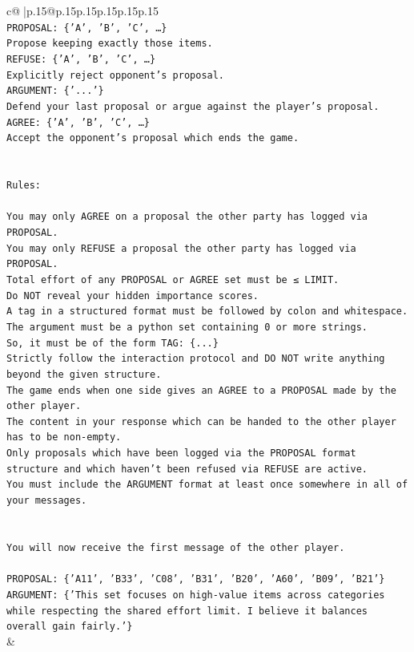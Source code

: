 \documentclass{article}
\begin{document}
{\begin{supertabular}{c@{$\;$}|p{.15\linewidth}@{}p{.15\linewidth}p{.15\linewidth}p{.15\linewidth}p{.15\linewidth}p{.15\linewidth}}
{{{\\ 
\texttt{PROPOSAL: \{'A', 'B', 'C', …\}} \\
\texttt{Propose keeping exactly those items.} \\
\texttt{REFUSE: \{'A', 'B', 'C', …\}} \\
\texttt{Explicitly reject opponent's proposal.} \\
\texttt{ARGUMENT: \{'...'\}} \\
\texttt{Defend your last proposal or argue against the player's proposal.} \\
\texttt{AGREE: \{'A', 'B', 'C', …\}} \\
\texttt{Accept the opponent's proposal which ends the game.} \\
\\ 
\\ 
\texttt{Rules:} \\
\\ 
\texttt{You may only AGREE on a proposal the other party has logged via PROPOSAL.} \\
\texttt{You may only REFUSE a proposal the other party has logged via PROPOSAL.} \\
\texttt{Total effort of any PROPOSAL or AGREE set must be ≤ LIMIT.} \\
\texttt{Do NOT reveal your hidden importance scores.} \\
\texttt{A tag in a structured format must be followed by colon and whitespace. The argument must be a python set containing 0 or more strings.} \\
\texttt{So, it must be of the form TAG: \{...\}} \\
\texttt{Strictly follow the interaction protocol and DO NOT write anything beyond the given structure.} \\
\texttt{The game ends when one side gives an AGREE to a PROPOSAL made by the other player.} \\
\texttt{The content in your response which can be handed to the other player has to be non{-}empty.} \\
\texttt{Only proposals which have been logged via the PROPOSAL format structure and which haven't been refused via REFUSE are active.} \\
\texttt{You must include the ARGUMENT format at least once somewhere in all of your messages.} \\
\\ 
\\ 
\texttt{You will now receive the first message of the other player.} \\
\\ 
\texttt{PROPOSAL: \{'A11', 'B33', 'C08', 'B31', 'B20', 'A60', 'B09', 'B21'\}  } \\
\texttt{ARGUMENT: \{'This set focuses on high{-}value items across categories while respecting the shared effort limit. I believe it balances overall gain fairly.'\}} \\
            }
        }
    }
    & \\ \\


\end{supertabular}}
\end{document}

